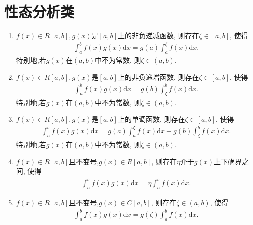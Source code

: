 \documentclass[../../main.tex]{subfiles}%
\begin{document}
\section{性态分析类}

\begin{theorem}[积分中值定理]\label{theorem:积分中值定理}
\begin{enumerate}[(1)]
\item\label{theorem:积分中值定理(1)}\(f(x)\in R[a,b],g(x)\)是\([a,b]\)上的非负递减函数, 则存在\(\zeta\in[a,b]\), 使得
\begin{align*}
\int_{a}^{b}f(x)g(x)\mathrm{d}x = g(a)\int_{a}^{\zeta}f(x)\mathrm{d}x.
\end{align*}
特别地,若\(g(x)\)在\((a,b)\)中不为常数, 则\(\zeta\in(a,b)\).

\item\label{theorem:积分中值定理(2)} \(f(x)\in R[a,b],g(x)\)是\([a,b]\)上的非负递增函数, 则存在\(\zeta\in[a,b]\), 使得
\begin{align*}
\int_{a}^{b}f(x)g(x)\mathrm{d}x = g(b)\int_{\zeta}^{b}f(x)\mathrm{d}x.
\end{align*}
特别地,若\(g(x)\)在\((a,b)\)中不为常数, 则\(\zeta\in(a,b)\).

\item \label{theorem:积分中值定理(3)}\(f(x)\in R[a,b],g(x)\)是\([a,b]\)上的单调函数, 则存在\(\zeta\in[a,b]\), 使得
\begin{align*}
\int_{a}^{b}f(x)g(x)\mathrm{d}x = g(a)\int_{a}^{\zeta}f(x)\mathrm{d}x + g(b)\int_{\zeta}^{b}f(x)\mathrm{d}x.
\end{align*}
特别地,若\(g(x)\)在\((a,b)\)中不为常数, 则\(\zeta\in(a,b)\).

\item \label{theorem:积分中值定理(4)}\(f(x)\in R[a,b]\)且不变号,\(g(x)\in R[a,b]\), 则存在\(\eta\)介于\(g(x)\)上下确界之间, 使得
\begin{align*}
\int_{a}^{b}f(x)g(x)\mathrm{d}x = \eta\int_{a}^{b}f(x)\mathrm{d}x.
\end{align*}

\item \label{theorem:积分中值定理(5)}\(f(x)\in R[a,b]\)且不变号,\(g(x)\in C[a,b]\), 则存在\(\zeta\in(a,b)\), 使得
\begin{align*}
\int_{a}^{b}f(x)g(x)\mathrm{d}x = g(\zeta)\int_{a}^{b}f(x)\mathrm{d}x.
\end{align*}
\end{enumerate}
\end{theorem}
\end{document}

